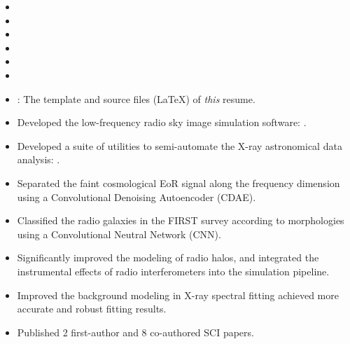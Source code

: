 \documentclass{resume}
\begin{document}
\begin{itemize}
  \item 
  \item 
  \item 
  \item 
  \item 
  \item 
  \item {}:
    The template and source files (\LaTeX) of \emph{this} resume.
\end{itemize}

\begin{itemize}
  \item Developed the low-frequency radio sky image simulation software:
    .
  \item Developed a suite of utilities to semi-automate the
    X-ray astronomical data analysis:
    .
  \item Separated the faint cosmological EoR signal along the frequency
    dimension using a Convolutional Denoising Autoencoder (CDAE).
  \item Classified the radio galaxies in the FIRST survey according to
    morphologies using a Convolutional Neutral Network (CNN).
  \item Significantly improved the modeling of radio halos,
    and integrated the instrumental effects of radio interferometers
    into the simulation pipeline.
  \item Improved the background modeling in X-ray spectral fitting
    achieved more accurate and robust fitting results.
  \item Published 2 first-author and 8 co-authored SCI papers.
\end{itemize}
\end{document}
